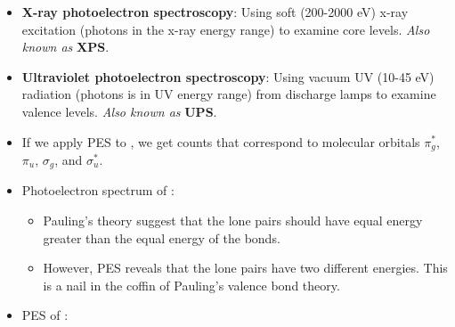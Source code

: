 \documentclass[../notes.tex]{subfiles}
\begin{document}
\begin{itemize}
\begin{figure}[h!]
\begin{subfigure}[b]{0.45\linewidth}
            \caption{Final state.}
            \label{fig:PES-atomicb}
        \end{subfigure}
        \caption{Photoelectron spectroscopy at an atomic level.}
        \label{fig:PES-atomic}
    \end{figure}
    \begin{itemize}
        \item A sample (solid, liquid, or gas) is impinged upon by to a focused beam of X-rays (say of $\SI{1.5}{\kilo\volt}$).
        \item When the sample is exposed to the X-rays, electrons fly out of the sample. The KE of these electrons can be measured.
        \item Essentially, $h\nu$ takes an electron from the core level to above the vacuum level. We know $h\nu$ and we measure $KE_\text{electron}$, allowing us to calculate the bonding energy of the electron: $h\nu=I_\text{BE}+E_\text{kinetic}$ (see Figure \ref{fig:PES-atomic}).
    \end{itemize}
    \item \textbf{X-ray photoelectron spectroscopy}: Using soft (200-2000 eV) x-ray excitation (photons in the x-ray energy range) to examine core levels. \emph{Also known as} \textbf{XPS}.
    \item \textbf{Ultraviolet photoelectron spectroscopy}: Using vacuum UV (10-45 eV) radiation (photons is in UV energy range) from discharge lamps to examine valence levels. \emph{Also known as} \textbf{UPS}.
    \item If we apply PES to , we get counts that correspond to molecular orbitals $\pi_g^*$, $\pi_u$, $\sigma_g$, and $\sigma_u^*$.
    \item Photoelectron spectrum of :
    \begin{itemize}
        \item Pauling's theory suggest that the lone pairs should have equal energy greater than the equal energy of the bonds.
        \item However, PES reveals that the lone pairs have two different energies. This is a nail in the coffin of Pauling's valence bond theory.
    \end{itemize}
    \item PES of :

\end{itemize}
\end{document}
